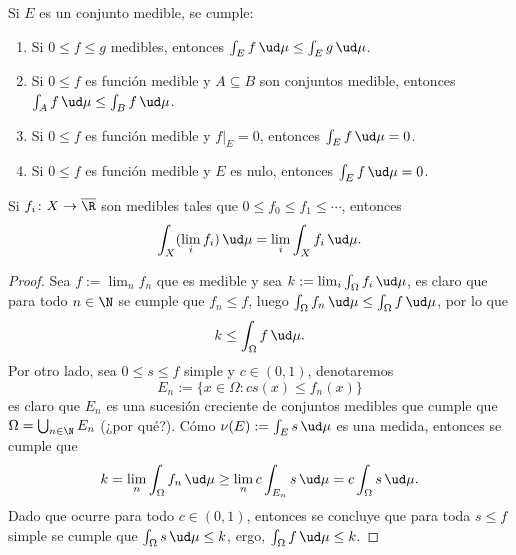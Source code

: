 \begin{prop}
	Si $E$ es un conjunto medible, se cumple:
	\begin{enumerate}
		\item Si $0\le f\le g$ medibles, entonces $\int_E f\,\ud\mu \le \int_E g\,\ud\mu$.
		\item Si $0\le f$ es función medible y $A\subseteq B$ son conjuntos medible, entonces $\int_A f\,\ud\mu \le \int_B f\,\ud\mu$.
		\item Si $0\le f$ es función medible y $f|_E = 0$, entonces $\int_E f\,\ud\mu = 0$.
		\item Si $0\le f$ es función medible y $E$ es nulo, entonces $\int_E f\,\ud\mu = 0$.
	\end{enumerate}
\end{prop}


\begin{thm}
	Si $f_i\colon X \to \overline\R$ son medibles tales que $0 \le f_0 \le f_1 \le \cdots$, entonces
	$$ \int_X (\lim_i f_i)\,\ud\mu = \lim_i \int_X f_i\,\ud\mu. $$
\end{thm}
\begin{proof}
	Sea $f := \lim_n f_n$ que es medible y sea $k := \lim_i \int_\Omega f_i\,\ud\mu$, es claro que para todo $n\in\N$ se cumple que $f_n \le f$,
	luego $\int_\Omega f_n\,\ud\mu \le \int_\Omega f\,\ud\mu$, por lo que
	$$ k \le \int_\Omega f\,\ud\mu. $$
	Por otro lado, sea $0\le s \le f$ simple y $c\in(0,1)$, denotaremos 
	$$ E_n := \{ x\in\Omega : cs(x) \le f_n(x) \} $$
	es claro que $E_n$ es una sucesión creciente de conjuntos medibles que cumple que $\Omega = \bigcup_{n\in\N} E_n$ (¿por qué?).
	Cómo $\nu(E) := \int_E s\,\ud\mu$ es una medida, entonces se cumple que
	$$ k = \lim_n \int_\Omega f_n\,\ud\mu \ge \lim_n c\int_{E_n} s\,\ud\mu = c\int_\Omega s\,\ud\mu. $$
	Dado que ocurre para todo $c\in(0,1)$, entonces se concluye que para toda $s\le f$ simple se cumple que $\int_\Omega s\,\ud\mu \le k$,
	ergo, $\int_\Omega f\,\ud\mu \le k$.
\end{proof}

